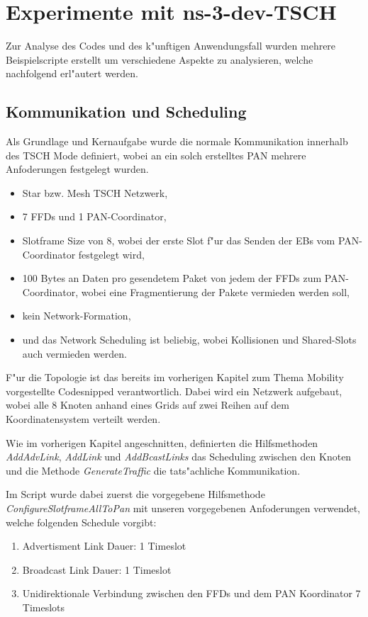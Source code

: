 
\section{Experimente mit ns-3-dev-TSCH}

Zur Analyse des Codes und des k"unftigen Anwendungsfall wurden mehrere Beispielscripte
erstellt um verschiedene Aspekte zu analysieren, welche nachfolgend erl"autert werden.

\subsection{Kommunikation und Scheduling}

Als Grundlage und Kernaufgabe wurde die normale Kommunikation innerhalb des TSCH
Mode definiert, wobei an ein solch erstelltes PAN mehrere Anfoderungen festgelegt wurden.

\begin{itemize}
  \item Star bzw. Mesh TSCH Netzwerk,
  \item 7 FFDs und 1 PAN-Coordinator,
  \item Slotframe Size von 8, wobei der erste Slot f"ur das Senden der
  EBs vom PAN-Coordinator festgelegt wird,
  \item 100 Bytes an Daten pro gesendetem Paket von jedem der FFDs zum
  PAN-Coordinator, wobei eine Fragmentierung der Pakete vermieden werden soll,
  \item kein Network-Formation,
  \item und das Network Scheduling ist beliebig, wobei Kollisionen und Shared-Slots
  auch vermieden werden.
\end{itemize}

F"ur die Topologie ist das bereits im vorherigen Kapitel zum Thema Mobility vorgestellte
Codesnipped verantwortlich. Dabei wird ein Netzwerk aufgebaut, wobei alle 8 Knoten
anhand eines Grids auf zwei Reihen auf dem Koordinatensystem verteilt werden.

Wie im vorherigen Kapitel angeschnitten, definierten die Hilfsmethoden \textit{AddAdvLink},
\textit{AddLink} und \textit{AddBcastLinks} das Scheduling zwischen den Knoten
und die Methode \textit{GenerateTraffic} die tats"achliche Kommunikation.

Im Script wurde dabei zuerst die vorgegebene Hilfsmethode \textit{ConfigureSlotframeAllToPan}
mit unseren vorgegebenen Anfoderungen verwendet, welche folgenden Schedule vorgibt:

\begin{enumerate}
  \item Advertisment Link Dauer: 1 Timeslot
  \item Broadcast Link Dauer: 1 Timeslot
  \item Unidirektionale Verbindung zwischen den FFDs und dem PAN Koordinator 7 Timeslots
\end{enumerate}

